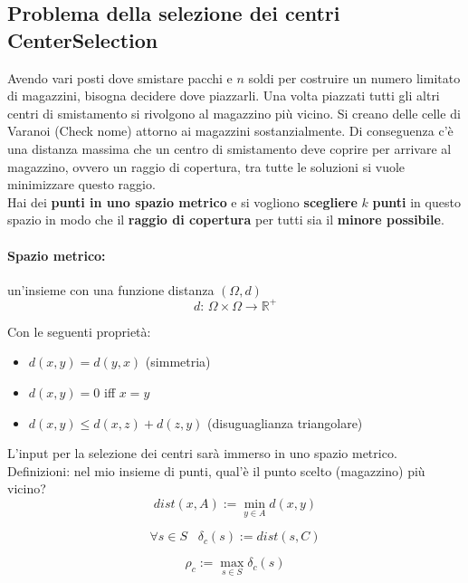 \newpage

\subsection{Problema della selezione dei centri CenterSelection}
Avendo vari posti dove smistare pacchi e $n$ soldi per costruire un numero limitato di magazzini, bisogna decidere dove piazzarli. Una volta piazzati tutti gli altri centri di smistamento si rivolgono al magazzino più vicino. Si creano delle celle di Varanoi (Check nome) attorno ai magazzini sostanzialmente. Di conseguenza c'è una distanza massima che un centro di smistamento deve coprire per arrivare al magazzino, ovvero un raggio di copertura, tra tutte le soluzioni si vuole minimizzare questo raggio.\\

Hai dei \textbf{punti in uno spazio metrico} e si vogliono \textbf{scegliere} $k$ \textbf{punti} in questo spazio in modo che il \textbf{raggio di copertura} per tutti sia il \textbf{minore possibile}.\\

\paragraph{Spazio metrico:} un'insieme con una funzione distanza $(\Omega, d)$ 
$$d: \, \Omega  \times \Omega \rightarrow \mathbb{R}^+$$

Con le seguenti proprietà:
\begin{itemize}
	\item $d(x,y) = d(y,x)$ (simmetria)
	\item $d(x,y) = 0$ iff $x=y$
	\item $d(x,y) \leq d(x,z) + d(z,y)$ (disuguaglianza triangolare)
\end{itemize}
L'input per la selezione dei centri sarà immerso in uno spazio metrico.\\

Definizioni: nel mio insieme di punti, qual'è il punto scelto (magazzino) più vicino?
$$ dist(x,A) := \min_{y \in A} d(x,y) $$

$$ \forall s \in S \;\;\; \delta_c (s) := dist(s,C)$$

$$ \rho_c := \max_{s \in S} \delta_c (s) $$

\newpage

